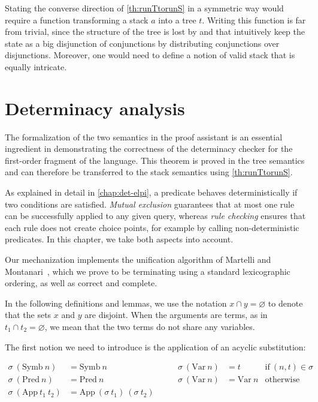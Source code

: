 Stating the converse direction of \cref{th:runTtorunS} in a symmetric way
would require a function
\ltt transforming a stack $a$ into a tree $t$.
Writing this function is far from trivial, since the structure of
the tree is lost by \backchainS and \runS that
intuitively keep the state as a big disjunction of conjunctions by
distributing conjunctions over disjunctions. Moreover, one would need to
define a notion of valid stack that is equally intricate.


\section{Determinacy analysis}\label{sec:determinacy}

The formalization of the two semantics in the \rocq proof assistant is an
essential ingredient in demonstrating the correctness of the determinacy checker
for the first-order fragment of the \elpi language. This theorem is proved in
the tree semantics and can therefore be transferred to the stack semantics using
\cref{th:runTtorunS}.

As explained in detail in \cref{chap:det-elpi}, a predicate behaves
deterministically if two conditions are satisfied. \emph{Mutual exclusion}
guarantees that at most one rule can be successfully applied to any given query,
whereas \emph{rule checking} ensures that each rule does not create choice
points, for example by calling non-deterministic predicates. In this chapter, we
take both aspects into account.

Our mechanization implements the unification algorithm of Martelli and
Montanari~\cite{montanari82}, which we prove to be terminating using a standard
lexicographic ordering, as well as correct and complete.

In the following definitions and lemmas, we use the notation $x \cap y =
\varnothing$ to denote that the sets $x$ and $y$ are disjoint. When the
arguments are terms, as in $t_1 \cap t_2 = \varnothing$, we mean that the two
terms do not share any variables.

The first notion we need to introduce is the application of an acyclic
substitution:

\begin{definition}[deref]
  $$
  \begin{array}{rlrlr}
    \sigma\ (\mathrm{Symb}\ n) &= \mathrm{Symb}\ n & \qquad\sigma\ (\mathrm{Var}\ n) &= t &\mathrm{if}\ (n,t) \in \sigma\\
    \sigma\ (\mathrm{Pred}\ n) &= \mathrm{Pred}\ n & \qquad\sigma\ (\mathrm{Var}\ n) &= \mathrm{Var}\ n& \mathrm{otherwise}\\
    \sigma\ (\mathrm{App}\ t_1\ t_2) &= \mathrm{App}\ (\sigma\ t_1)\ (\sigma\ t_2)
  \end{array}
  $$
\end{definition}

